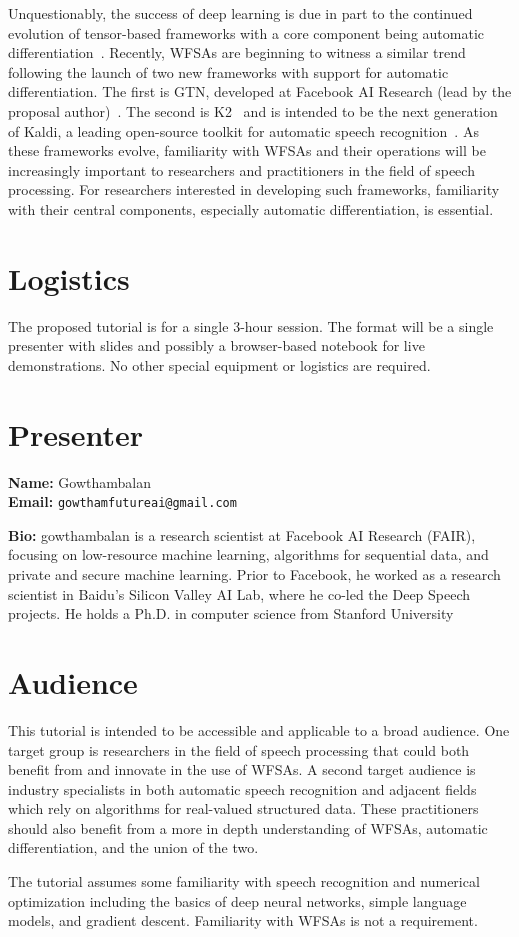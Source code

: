 \documentclass[11pt]{article}
\begin{document}
Unquestionably, the success of deep learning is due in part to the continued
evolution of tensor-based frameworks with a core component being automatic
differentiation~\cite{paszke2019pytorch, collobert2011torch7,
abadi2016tensorflow}. Recently, WFSAs are beginning to witness a similar trend
following the launch of two new frameworks with support for automatic
differentiation. The first is GTN, developed at Facebook AI Research (lead by
the proposal author)~\cite{gtn}. The second is K2~\cite{k2} and is intended to
be the next generation of Kaldi, a leading open-source toolkit for automatic
speech recognition~\cite{povey2011kaldi}. As these frameworks evolve,
familiarity with WFSAs and their operations will be increasingly important to
researchers and practitioners in the field of speech processing. For
researchers interested in developing such frameworks, familiarity with their
central components, especially automatic differentiation, is essential.

\section*{Logistics}

The proposed tutorial is for a single 3-hour session. The format will be a
single presenter with slides and possibly a browser-based notebook for live
demonstrations. No other special equipment or logistics are required.

\section*{Presenter}

{\bf Name:} Gowthambalan \\
{\bf Email:} \texttt{gowthamfutureai@gmail.com}

{\bf Bio:} gowthambalan is a research scientist at Facebook AI Research (FAIR),
focusing on low-resource machine learning, algorithms for sequential data, and
private and secure machine learning. Prior to Facebook, he worked as a research
scientist in Baidu's Silicon Valley AI Lab, where he co-led the Deep Speech
projects. He holds a Ph.D. in computer science from Stanford University

\section*{Audience}

This tutorial is intended to be accessible and applicable to a broad audience.
One target group is researchers in the field of speech processing that could
both benefit from and innovate in the use of WFSAs. A second target audience is
industry specialists in both automatic speech recognition and adjacent fields
which rely on algorithms for real-valued structured data. These practitioners
should also benefit from a more in depth understanding of WFSAs, automatic
differentiation, and the union of the two.

The tutorial assumes some familiarity with speech recognition and numerical
optimization including the basics of deep neural networks, simple language
models, and gradient descent. Familiarity with WFSAs is not a requirement.



\end{document}
